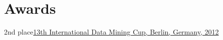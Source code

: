 \documentclass{tccv}
\begin{document}
\section{Awards}

\begin{factlist}
\item{2nd place}{\href{http://www.data-mining-cup.de/en/review/dmc-2012/}{13th International Data Mining Cup, Berlin, Germany, 2012}}
\end{factlist}
\end{document}
